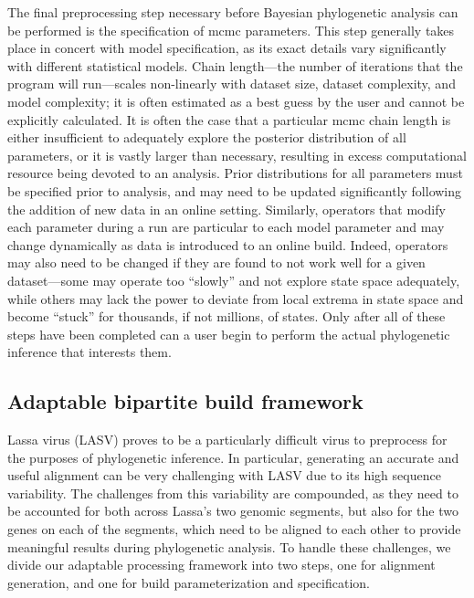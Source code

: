 The final preprocessing step necessary before Bayesian phylogenetic analysis can be performed is the specification of \gls{mcmc} parameters.
This step generally takes place in concert with model specification, as its exact details vary significantly with different statistical models.
Chain length---the number of iterations that the program will run---scales non-linearly with dataset size, dataset complexity, and model complexity; it is often estimated as a best guess by the user and cannot be explicitly calculated.
It is often the case that a particular \gls{mcmc} chain length is either insufficient to adequately explore the posterior distribution of all parameters, or it is vastly larger than necessary, resulting in excess computational resource being devoted to an analysis.
Prior distributions for all parameters must be specified prior to analysis, and may need to be updated significantly following the addition of new data in an online setting.
Similarly, operators that modify each parameter during a run are particular to each model parameter and may change dynamically as data is introduced to an online build.
Indeed, operators may also need to be changed if they are found to not work well for a given dataset---some may operate too ``slowly'' and not explore state space adequately, while others may lack the power to deviate from local extrema in state space and become ``stuck'' for thousands, if not millions, of states.
Only after all of these steps have been completed can a user begin to perform the actual phylogenetic inference that interests them.

\subsection{Adaptable bipartite build framework}

Lassa virus (LASV) proves to be a particularly difficult virus to preprocess for the purposes of phylogenetic inference.
In particular, generating an accurate and useful alignment can be very challenging with LASV due to its high sequence variability.
The challenges from this variability are compounded, as they need to be accounted for both across Lassa's two genomic segments, but also for the two genes on each of the segments, which need to be aligned to each other to provide meaningful results during phylogenetic analysis.
To handle these challenges, we divide our adaptable processing framework into two steps, one for alignment generation, and one for build parameterization and specification.

